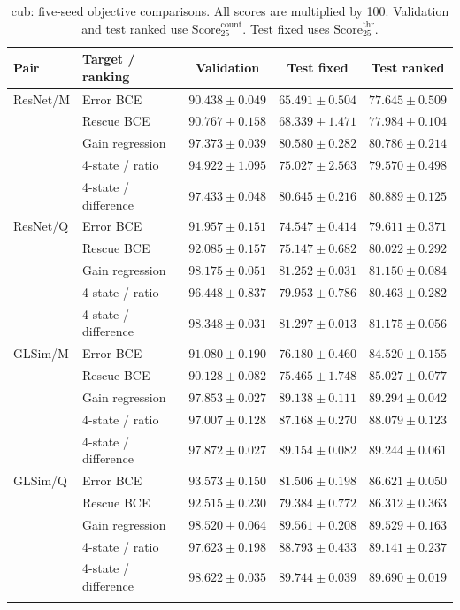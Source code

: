 \begin{table}[H]\centering
\caption{cub: five-seed objective comparisons. All scores are multiplied by 100. Validation and test ranked use $\mathrm{Score}_{25}^{\mathrm{count}}$. Test fixed uses $\mathrm{Score}_{25}^{\mathrm{thr}}$.}
\fontsize{7.5}{9}\selectfont
\setlength{\tabcolsep}{3pt}
\begin{tabular}{llccc}\toprule
Pair & Target / ranking & Validation & Test fixed & Test ranked \\\midrule
ResNet/M & Error BCE & $90.438\pm0.049$ & $65.491\pm0.504$ & $77.645\pm0.509$ \\
 & Rescue BCE & $90.767\pm0.158$ & $68.339\pm1.471$ & $77.984\pm0.104$ \\
 & Gain regression & $97.373\pm0.039$ & $80.580\pm0.282$ & $80.786\pm0.214$ \\
 & 4-state / ratio & $94.922\pm1.095$ & $75.027\pm2.563$ & $79.570\pm0.498$ \\
 & 4-state / difference & $97.433\pm0.048$ & $80.645\pm0.216$ & $80.889\pm0.125$ \\
\addlinespace
ResNet/Q & Error BCE & $91.957\pm0.151$ & $74.547\pm0.414$ & $79.611\pm0.371$ \\
 & Rescue BCE & $92.085\pm0.157$ & $75.147\pm0.682$ & $80.022\pm0.292$ \\
 & Gain regression & $98.175\pm0.051$ & $81.252\pm0.031$ & $81.150\pm0.084$ \\
 & 4-state / ratio & $96.448\pm0.837$ & $79.953\pm0.786$ & $80.463\pm0.282$ \\
 & 4-state / difference & $98.348\pm0.031$ & $81.297\pm0.013$ & $81.175\pm0.056$ \\
\addlinespace
GLSim/M & Error BCE & $91.080\pm0.190$ & $76.180\pm0.460$ & $84.520\pm0.155$ \\
 & Rescue BCE & $90.128\pm0.082$ & $75.465\pm1.748$ & $85.027\pm0.077$ \\
 & Gain regression & $97.853\pm0.027$ & $89.138\pm0.111$ & $89.294\pm0.042$ \\
 & 4-state / ratio & $97.007\pm0.128$ & $87.168\pm0.270$ & $88.079\pm0.123$ \\
 & 4-state / difference & $97.872\pm0.027$ & $89.154\pm0.082$ & $89.244\pm0.061$ \\
\addlinespace
GLSim/Q & Error BCE & $93.573\pm0.150$ & $81.506\pm0.198$ & $86.621\pm0.050$ \\
 & Rescue BCE & $92.515\pm0.230$ & $79.384\pm0.772$ & $86.312\pm0.363$ \\
 & Gain regression & $98.520\pm0.064$ & $89.561\pm0.208$ & $89.529\pm0.163$ \\
 & 4-state / ratio & $97.623\pm0.198$ & $88.793\pm0.433$ & $89.141\pm0.237$ \\
 & 4-state / difference & $98.622\pm0.035$ & $89.744\pm0.039$ & $89.690\pm0.019$ \\
\addlinespace
\bottomrule\end{tabular}\end{table}
